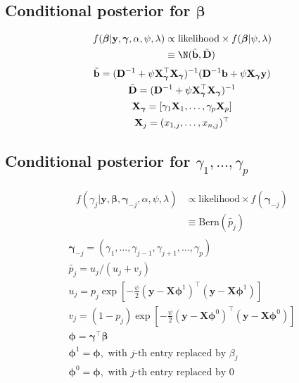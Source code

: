 \subsection[Conditional posterior for beta]{Conditional posterior for $\boldsymbol\beta$}

\begin{align*}
	f(\boldsymbol\beta|\mathbf y,\boldsymbol\gamma, \alpha, \psi, \lambda)
	&\propto \text{likelihood}\times f(\boldsymbol\beta|\psi, \lambda) \\
	&\equiv \N(\tilde{\mathbf b}, \tilde{\mathbf D})
\end{align*}
\begin{align*}
	\begin{gathered}
		\tilde{\mathbf b} = (\mathbf D^{-1} + \psi\mathbf X_{\boldsymbol\gamma}^\top\mathbf X_{\boldsymbol\gamma})^{-1}(\mathbf D^{-1}\mathbf b + \psi\mathbf X_{\boldsymbol\gamma}\mathbf y) \\
		\tilde{\mathbf D} = (\mathbf D^{-1} + \psi\mathbf X_{\boldsymbol\gamma}^\top\mathbf X_{\boldsymbol\gamma})^{-1} \\
		\mathbf X_{\boldsymbol\gamma} = [\gamma_1\mathbf X_1, \dots, \gamma_p\mathbf X_p] \\
		\mathbf X_j = (x_{1,j}, \dots, x_{n,j})^\top
	\end{gathered}
\end{align*}


\subsection{Conditional posterior for $\gamma_1,\dots,\gamma_p$}

\begin{align*}
	f(\gamma_j|\mathbf y,\boldsymbol\beta, \boldsymbol\gamma_{-j}, \alpha, \psi, \lambda)
	&\propto \text{likelihood}\times f(\boldsymbol\gamma_{-j}) \\
	&\equiv \text{Bern}(\tilde{p_j})
\end{align*}
\begin{align*}
	\begin{gathered}
		\boldsymbol\gamma_{-j} = (\gamma_1, \dots, \gamma_{j-1}, \gamma_{j+1}, \dots, \gamma_p) \\
		\tilde{p_j} = u_j/(u_j + v_j) \\
		u_j = p_j \exp \left[-\frac{\psi}{2} (\mathbf y -  \mathbf X \boldsymbol\phi^1)^\top (\mathbf y -  \mathbf X \boldsymbol\phi^1)\right] \\
		v_j = (1-p_j) \exp \left[-\frac{\psi}{2} (\mathbf y -  \mathbf X \boldsymbol\phi^0)^\top (\mathbf y -  \mathbf X \boldsymbol\phi^0)\right] \\
		\boldsymbol\phi = \boldsymbol\gamma^\top\boldsymbol\beta \\
		\boldsymbol\phi^1 = \boldsymbol\phi, \text{ with $j$-th entry replaced by } \beta_j \\
		\boldsymbol\phi^0 = \boldsymbol\phi, \text{ with $j$-th entry replaced by } 0
	\end{gathered}
\end{align*}

